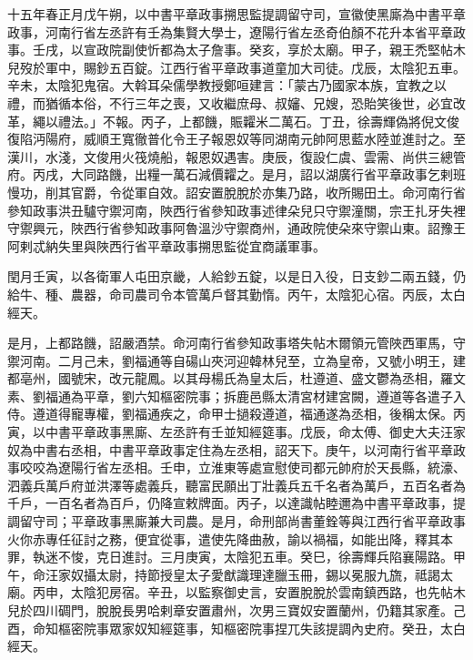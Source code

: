 
\begin{pinyinscope}

 十五年春正月戊午朔，以中書平章政事搠思監提調留守司，宣徽使黑廝為中書平章政事，河南行省左丞許有壬為集賢大學士，遼陽行省左丞奇伯顏不花升本省平章政事。壬戌，以宣政院副使忻都為太子詹事。癸亥，享於太廟。甲子，親王禿堅帖木兒歿於軍中，賜鈔五百錠。江西行省平章政事道童加大司徒。戊辰，太陰犯五車。辛未，太陰犯鬼宿。大斡耳朵儒學教授鄭咺建言：「蒙古乃國家本族，宜教之以禮，而猶循本俗，不行三年之喪，又收繼庶母、叔嬸、兄嫂，恐貽笑後世，必宜改革，繩以禮法。」不報。丙子，上都饑，賑糶米二萬石。丁丑，徐壽輝偽將倪文俊復陷沔陽府，威順王寬徹普化令王子報恩奴等同湖南元帥阿思藍水陸並進討之。至漢川，水淺，文俊用火筏燒船，報恩奴遇害。庚辰，復設仁虞、雲需、尚供三總管府。丙戌，大同路饑，出糧一萬石減價糶之。是月，詔以湖廣行省平章政事乞剌班慢功，削其官爵，令從軍自效。詔安置脫脫於亦集乃路，收所賜田土。命河南行省參知政事洪丑驢守禦河南，陜西行省參知政事述律朵兒只守禦潼關，宗王扎牙失裡守禦興元，陜西行省參知政事阿魯溫沙守禦商州，通政院使朵來守禦山東。詔豫王阿剌忒納失里與陜西行省平章政事搠思監從宜商議軍事。



 閏月壬寅，以各衛軍人屯田京畿，人給鈔五錠，以是日入役，日支鈔二兩五錢，仍給牛、種、農器，命司農司令本管萬戶督其勤惰。丙午，太陰犯心宿。丙辰，太白經天。



 是月，上都路饑，詔嚴酒禁。命河南行省參知政事塔失帖木爾領元管陜西軍馬，守禦河南。二月己未，劉福通等自碭山夾河迎韓林兒至，立為皇帝，又號小明王，建都亳州，國號宋，改元龍鳳。以其母楊氏為皇太后，杜遵道、盛文鬱為丞相，羅文素、劉福通為平章，劉六知樞密院事；拆鹿邑縣太清宮材建宮闕，遵道等各遣子入侍。遵道得寵專權，劉福通疾之，命甲士撾殺遵道，福通遂為丞相，後稱太保。丙寅，以中書平章政事黑廝、左丞許有壬並知經筵事。戊辰，命太傅、御史大夫汪家奴為中書右丞相，中書平章政事定住為左丞相，詔天下。庚午，以河南行省平章政事咬咬為遼陽行省左丞相。壬申，立淮東等處宣慰使司都元帥府於天長縣，統濠、泗義兵萬戶府並洪澤等處義兵，聽富民願出丁壯義兵五千名者為萬戶，五百名者為千戶，一百名者為百戶，仍降宣敕牌面。丙子，以達識帖睦邇為中書平章政事，提調留守司；平章政事黑廝兼大司農。是月，命刑部尚書董銓等與江西行省平章政事火你赤專任征討之務，便宜從事，遣使先降曲赦，諭以禍福，如能出降，釋其本罪，執迷不悛，克日進討。三月庚寅，太陰犯五車。癸巳，徐壽輝兵陷襄陽路。甲午，命汪家奴攝太尉，持節授皇太子愛猷識理達臘玉冊，錫以冕服九旒，祗謁太廟。丙申，太陰犯房宿。辛丑，以監察御史言，安置脫脫於雲南鎮西路，也先帖木兒於四川碉門，脫脫長男哈剌章安置肅州，次男三寶奴安置蘭州，仍籍其家產。己酉，命知樞密院事眾家奴知經筵事，知樞密院事捏兀失該提調內史府。癸丑，太白經天。




\end{pinyinscope}
